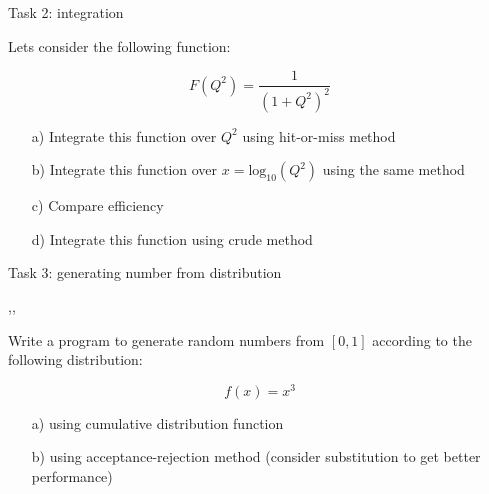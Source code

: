 \begin{slide}[toc = Task 2]{Task 2: integration}
\null\vfill

  \twocolumn
  {
      Lets consider the following function:
  
      $$F(Q^2) = \frac{1}{(1 + Q^2)^2}$$
      
    \begin{itemize}

      \item[a)] Integrate this function over $Q^2$ using hit-or-miss method
      
      \item[b)] Integrate this function over $x = \mbox{log}_{10}(Q^2)$ using the same method
      
      \item[c)] Compare efficiency
      
      \item[d)] Integrate this function using crude method
      
    \end{itemize}    
  }
  {
    
    \vspace{-10pt}
        
  }


\vfill\null
\end{slide}

\begin{slide}[toc = Task 3]{Task 3: generating number from distribution}
\null\vfill

  \twocolumn
  {
    \sep\sep
  
      Write a program to generate random numbers from $[0,1]$ according to the following distribution:
      
      $$f(x) = x^3$$      
  }
  {
    
  }
  
  \begin{itemize}
      \item[a)] using cumulative distribution function
      
      \item[b)] using acceptance-rejection method (consider substitution to get better performance)
  \end{itemize}

\vfill\null
\end{slide}

